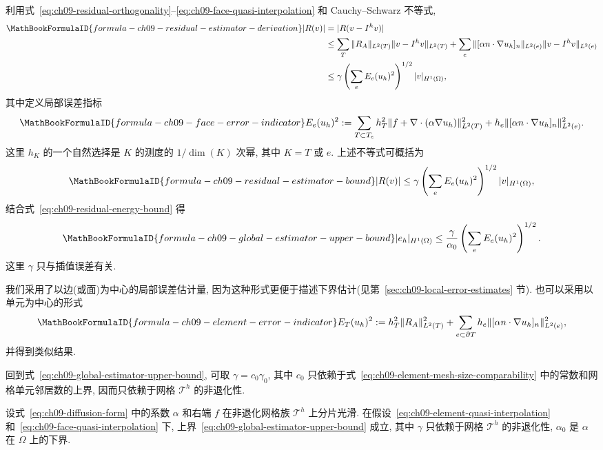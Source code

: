 利用式~\eqref{eq:ch09-residual-orthogonality}--\eqref{eq:ch09-face-quasi-interpolation} 和 Cauchy--Schwarz 不等式,
\begin{align*}
\MathBookFormulaID{formula-ch09-residual-estimator-derivation}
|R(v)|
&=|R(v-I^hv)|\\
&\leq\sum_T\|R_A\|_{L^2(T)}\|v-I^hv\|_{L^2(T)}
+\sum_e\|[\alpha n\cdot\nabla u_h]_n\|_{L^2(e)}\|v-I^hv\|_{L^2(e)}\\
&\leq\gamma\left(\sum_eE_e(u_h)^2\right)^{1/2}|v|_{H^1(\Omega)},
\end{align*}
其中定义局部误差指标
\begin{equation}
\MathBookFormulaID{formula-ch09-face-error-indicator}
\label{eq:ch09-face-error-indicator}
E_e(u_h)^2:=\sum_{T\subset T_e}h_T^2\|f+\nabla\cdot(\alpha\nabla u_h)\|_{L^2(T)}^2
+h_e\|[\alpha n\cdot\nabla u_h]_n\|_{L^2(e)}^2.
\end{equation}
这里 $h_K$ 的一个自然选择是 $K$ 的测度的 $1/\dim(K)$ 次幂, 其中 $K=T$ 或 $e$. 上述不等式可概括为
\begin{equation}
\MathBookFormulaID{formula-ch09-residual-estimator-bound}
\label{eq:ch09-residual-estimator-bound}
|R(v)|\leq\gamma\left(\sum_eE_e(u_h)^2\right)^{1/2}|v|_{H^1(\Omega)},
\end{equation}
结合式~\eqref{eq:ch09-residual-energy-bound} 得
\begin{equation}
\MathBookFormulaID{formula-ch09-global-estimator-upper-bound}
\label{eq:ch09-global-estimator-upper-bound}
|e_h|_{H^1(\Omega)}\leq\frac{\gamma}{\alpha_0}
\left(\sum_eE_e(u_h)^2\right)^{1/2}.
\end{equation}
这里 $\gamma$ 只与插值误差有关.

我们采用了以边(或面)为中心的局部误差估计量, 因为这种形式更便于描述下界估计(见第~\ref{sec:ch09-local-error-estimates} 节). 也可以采用以单元为中心的形式
\begin{equation}
\MathBookFormulaID{formula-ch09-element-error-indicator}
\label{eq:ch09-element-error-indicator}
E_T(u_h)^2:=h_T^2\|R_A\|_{L^2(T)}^2
+\sum_{e\subset\partial T}h_e\|[\alpha n\cdot\nabla u_h]_n\|_{L^2(e)}^2,
\end{equation}
并得到类似结果.

回到式~\eqref{eq:ch09-global-estimator-upper-bound}, 可取 $\gamma=c_0\gamma_0$, 其中 $c_0$ 只依赖于式~\eqref{eq:ch09-element-mesh-size-comparability} 中的常数和网格单元邻居数的上界, 因而只依赖于网格 $\mathcal T^h$ 的非退化性.

\begin{Theorem}
\label{thm:ch09-residual-estimator-upper-bound}
设式~\eqref{eq:ch09-diffusion-form} 中的系数 $\alpha$ 和右端 $f$ 在非退化网格族 $\mathcal T^h$ 上分片光滑. 在假设~\eqref{eq:ch09-element-quasi-interpolation} 和~\eqref{eq:ch09-face-quasi-interpolation} 下, 上界~\eqref{eq:ch09-global-estimator-upper-bound} 成立, 其中 $\gamma$ 只依赖于网格 $\mathcal T^h$ 的非退化性, $\alpha_0$ 是 $\alpha$ 在 $\Omega$ 上的下界.
\end{Theorem}
